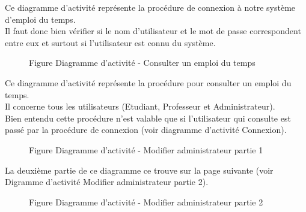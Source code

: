 \documentclass[a4paper, 11pt]{article}
\begin{document}
        Ce diagramme d'activité représente la procédure de connexion à notre système d'emploi du temps.\\
        Il faut donc bien vérifier si le nom d'utilisateur et le mot de passe correspondent entre eux et surtout si l'utilisateur est connu du système.
        \clearpage
        \begin{figure}[h]
        \caption{Figure Diagramme d'activité - Consulter un emploi du temps}
        \label{fig-diag-activite-consulter}
        \end{figure}
        Ce diagramme d'activité représente la procédure pour consulter un emploi du temps.\\
        Il concerne tous les utilisateurs (Etudiant, Professeur et Administrateur).\\
        Bien entendu cette procédure n'est valable que si l'utilisateur qui consulte est passé par la procédure de connexion (voir diagramme d'activité Connexion).
        \clearpage
        \begin{figure}[h]
        \caption{Figure Diagramme d'activité - Modifier administrateur partie 1}
        \label{fig-diag-activite-modifier-admin-part1}
        \end{figure}
        La deuxième partie de ce diagramme ce trouve sur la page suivante (voir Digramme d'activité Modifier administrateur partie 2).
        \clearpage
        \begin{figure}[h]
        \caption{Figure Diagramme d'activité - Modifier administrateur partie 2}
        \label{fig-diag-activite-modifier-admin-part2}
        \end{figure}
\end{document}
